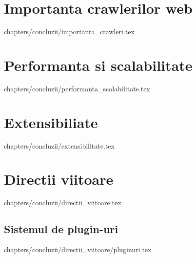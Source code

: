 \documentclass[12pt,oneside]{report}
\begin{document}
\section{Importanta crawlerilor web}
 {
	chapters/concluzii/importanta_crawleri.tex
}

\section{Performanta si scalabilitate}
 {
	chapters/concluzii/performanta_scalabilitate.tex
}
\clearpage

\section{Extensibiliate}
 {
	chapters/concluzii/extensibilitate.tex
}

\section{Directii viitoare}
 {
	chapters/concluzii/directii_viitoare.tex
}

\subsection{Sistemul de plugin-uri}
 {
	chapters/concluzii/directii_viitoare/pluginuri.tex
}

\clearpage


\end{document}
